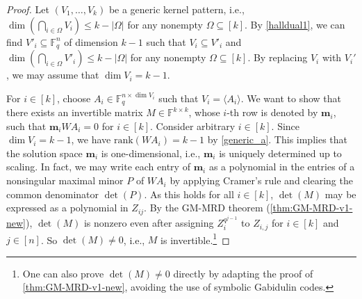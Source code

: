 \documentclass[11pt]{article}
\theoremstyle{plain}
\theoremstyle{definition}
\theoremstyle{remark}
\newcommand{\F}{\mathbb{F}}
\newcommand{\spa}{\mathrm{span}}
\newcommand{\bv}{\bm{v}}
\newcommand{\vm}{\bm{m}}
\newcommand{\bw}{\bm{w}}
\newcommand{\rank}{\mathrm{rank}}
\begin{document}
\begin{proof}
Let $(V_1,\dots,V_k)$ be a generic kernel pattern, i.e., $\dim\left(\bigcap_{i\in \Omega}V_i\right)\leq k-|\Omega|$ for any nonempty $\Omega\subseteq [k]$.  By \cref{halldual1}, we can find $V'_i\subseteq \F_q^n$ of dimension $k-1$ such that $V_i\subseteq V'_i$ and $\dim(\bigcap_{i\in \Omega}V'_i)\leq k-|\Omega|$ for any nonempty $\Omega\subseteq [k]$. By replacing $V_i$ with $V_i'$, we may assume that $\dim V_i=k-1$. 

For $i\in [k]$, choose $A_i\in \F_q^{n\times \dim V_i}$ such that $V_i=\langle A_i\rangle$. 
We want to show that there exists an invertible matrix $M\in \F^{k\times k}$, whose $i$-th row is denoted by $\vm_i$, such that $\vm_i W A_i=0$ for $i\in [k]$. 
Consider arbitrary $i\in [k]$.
Since $\dim V_i=k-1$, we have $\rank(WA_i)=k-1$ by \cref{generic_a}. This implies that the solution space $\vm_i$ is one-dimensional, i.e., $\vm_i$ is uniquely determined up to scaling. 
In fact, we may write each entry of $\vm_i$ as a polynomial in the entries of a nonsingular maximal minor $P$ of $WA_i$ by applying Cramer's rule and clearing the common denominator $\det(P)$. As this holds for all $i\in [k]$, $\det(M)$ may be expressed as a polynomial in $Z_{ij}$. By the GM-MRD theorem (\cref{thm:GM-MRD-v1-new}), $\det(M)$ is nonzero even after assigning $Z_i^{q^{j-1}}$ to $Z_{i,j}$ for $i\in [k]$ and $j\in [n]$. So $\det(M)\neq 0$, i.e., $M$ is invertible.\footnote{One can also prove $\det(M)\neq 0$ directly by adapting the proof of \cref{thm:GM-MRD-v1-new}, avoiding the use of symbolic Gabidulin codes.} 
	\end{proof}
\end{document}
